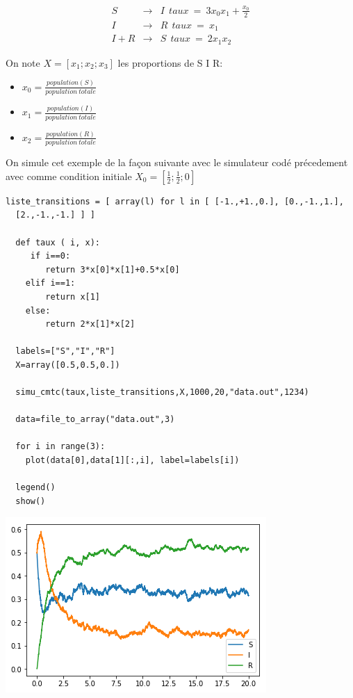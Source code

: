 \documentclass[a4paper]{article}
\begin{document}
\begin{eqnarray}
  S & \rightarrow & I \ \ taux \  = \  3x_0x_1+\frac{x_0}{2}\\
  I & \rightarrow & R \ \ taux \ = \ x_1\\
  I+R & \rightarrow & S \ \ taux \ = \ 2x_1x_2 
\end{eqnarray}

On note $X=[x_1;x_2;x_3]$ les proportions de S I R:
\begin{itemize}
\item$x_0= \frac{population(S)}{population\ totale}$
\item $x_1= \frac{population(I)}{population\ totale}$
\item $x_2= \frac{population(R)}{population\ totale}$
\end{itemize}
On simule cet exemple de la façon suivante avec le simulateur codé
précedement avec comme condition initiale $X_0=[\frac{1}{2};\frac{1}{2};0]$ \\

\begin{lstlisting}[frame=single]
  liste_transitions = [ array(l) for l in [ [-1.,+1.,0.], [0.,-1.,1.],
  [2.,-1.,-1.] ] ]

  def taux ( i, x):
     if i==0:
        return 3*x[0]*x[1]+0.5*x[0]
    elif i==1:
        return x[1]
    else:
        return 2*x[1]*x[2]
    
  labels=["S","I","R"]
  X=array([0.5,0.5,0.])

  simu_cmtc(taux,liste_transitions,X,1000,20,"data.out",1234)

  data=file_to_array("data.out",3)

  for i in range(3):
    plot(data[0],data[1][:,i], label=labels[i])

  legend()
  show()
\end{lstlisting}
\includegraphics{figure1.png}
\end{document}

